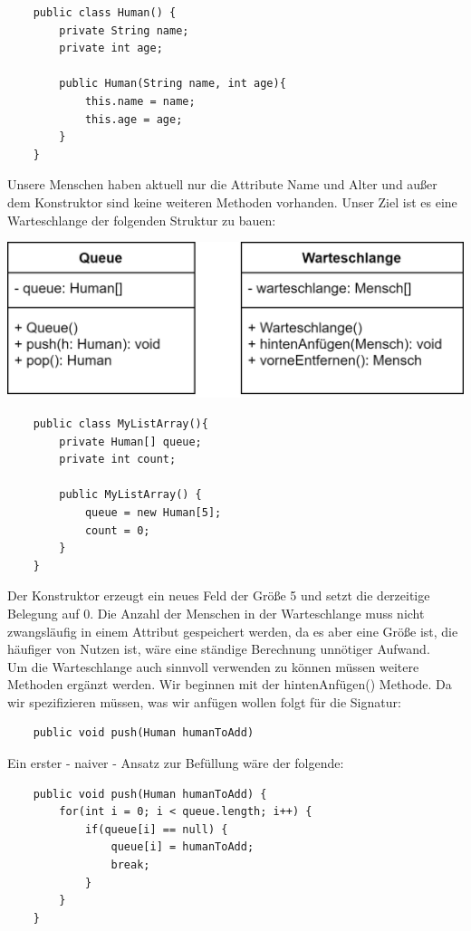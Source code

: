 \documentclass{article}
\begin{document}
\begin{verbatim}
    public class Human() {
        private String name;
        private int age; 
    
        public Human(String name, int age){
            this.name = name;
            this.age = age;
        }
    }
\end{verbatim}
Unsere Menschen haben aktuell nur die Attribute Name und Alter und außer dem Konstruktor sind keine weiteren
Methoden vorhanden. Unser Ziel ist es eine Warteschlange der folgenden Struktur zu bauen: \\
\begin{center}
    \includegraphics[scale=0.25]{../../media/queue_diagramm.png}
\end{center}

\begin{verbatim}
    public class MyListArray(){
        private Human[] queue;
        private int count;

        public MyListArray() {
            queue = new Human[5];
            count = 0;
        }
    }
\end{verbatim}
Der Konstruktor erzeugt ein neues Feld der Größe 5 und setzt die derzeitige Belegung auf 0. Die Anzahl der 
Menschen in der Warteschlange muss nicht zwangsläufig in einem Attribut gespeichert werden, da es aber eine 
Größe ist, die häufiger von Nutzen ist, wäre eine ständige Berechnung unnötiger Aufwand.  \\
Um die Warteschlange auch sinnvoll verwenden zu können müssen weitere Methoden ergänzt werden. Wir beginnen mit der hintenAnfügen() Methode. Da wir spezifizieren müssen, was wir anfügen wollen folgt für die Signatur:
\begin{verbatim}
    public void push(Human humanToAdd) 
\end{verbatim}
Ein erster - naiver - Ansatz zur Befüllung wäre der folgende: 
\begin{verbatim}
    public void push(Human humanToAdd) {
        for(int i = 0; i < queue.length; i++) {
            if(queue[i] == null) {
                queue[i] = humanToAdd;
                break;
            }
        }
    }
\end{verbatim}
\end{document}

